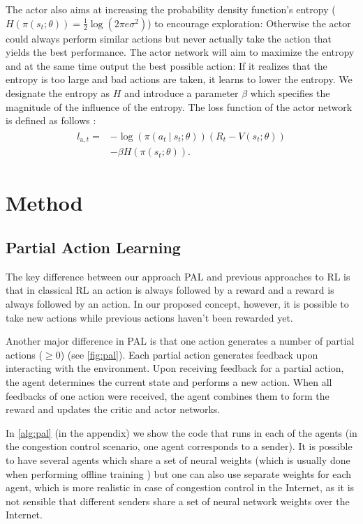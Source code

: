 \documentclass[newfonts=false,format=sigconf,10pt,letterpaper]{acmart}
\newcommand\givenbase[1][]{\:#1\lvert\:}
\let\given\givenbase
\begin{document}
The actor also aims at increasing the probability density function's entropy ($H\left( \pi\left( s_t; \theta \right)\right) = \frac{1}{2} \log \left( 2 \pi e \sigma^2 \right)$) to encourage exploration: Otherwise the actor could always perform similar actions but never actually take the action that yields the best performance. The actor network will aim to maximize the entropy and at the same time output the best possible action: If it realizes that the entropy is too large and bad actions are taken, it learns to lower the entropy. We designate the entropy as $H$ and introduce a parameter $\beta$ which specifies the magnitude of the influence of the entropy. The loss function of the actor network is defined as follows \cite{mnih_asynchronous_2016}:
\begin{align}
\begin{split}
l_{\text{a},t} =& -\log \left( \pi\left( a_t \given s_t; \theta \right)\right)\left( R_t - V(s_t; \theta) \right)\\ 
&- \beta H\left( \pi\left( s_t; \theta \right)\right).
\end{split}
\end{align}

\section{Method}
\subsection{Partial Action Learning}
\label{subsec:pal}

The key difference between our approach PAL and previous approaches to RL is that in classical RL an action is always followed by a reward and a reward is always followed by an action. In our proposed concept, however, it is possible to take new actions while previous actions haven't been rewarded yet.

Another major difference in PAL is that one action generates a number of partial actions ($\geq 0$) (see \autoref{fig:pal}). Each partial action generates feedback upon interacting with the environment. Upon receiving feedback for a partial action, the agent determines the current state and performs a new action. When all feedbacks of one action were received, the agent combines them to form the reward and updates the critic and actor networks.

In \autoref{alg:pal} (in the appendix) we show the code that runs in each of the agents (in the congestion control scenario, one agent corresponds to a sender). It is possible to have several agents which share a set of neural weights (which is usually done when performing offline training \cite{mnih_asynchronous_2016,mao_neural_2017}) but one can also use separate weights for each agent, which is more realistic in case of congestion control in the Internet, as it is not sensible that different senders share a set of neural network weights over the Internet.
\end{document}
